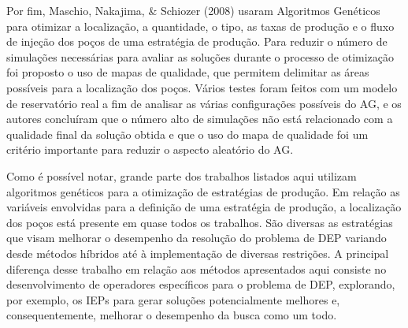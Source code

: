 Por fim,  Maschio, Nakajima, \& Schiozer (2008) usaram Algoritmos Genéticos para otimizar a localização, a quantidade, o tipo, as taxas de produção e o fluxo de injeção dos poços de uma estratégia de produção. Para reduzir o número de simulações necessárias para avaliar as soluções durante o processo de otimização foi proposto o uso de mapas de qualidade, que permitem delimitar as áreas possíveis para a localização dos poços. Vários testes foram feitos com um modelo de reservatório real a fim de analisar as várias configurações possíveis do AG, e os autores concluíram que o número alto de simulações não está relacionado com a qualidade final da solução obtida e que o uso do mapa de qualidade foi um critério importante para reduzir o aspecto aleatório do AG.

Como é possível notar, grande parte dos trabalhos listados aqui utilizam algoritmos genéticos para a otimização de estratégias de produção. Em relação as variáveis envolvidas para a definição de uma estratégia de produção, a localização dos poços está presente em quase todos os trabalhos. São diversas as estratégias que visam melhorar o desempenho da resolução do problema de DEP variando desde métodos híbridos até à implementação de diversas restrições. A principal diferença desse trabalho em relação aos métodos apresentados aqui consiste no desenvolvimento de operadores específicos para o problema de DEP, explorando, por exemplo, os IEPs para gerar soluções potencialmente melhores e, consequentemente, melhorar o desempenho da busca como um todo.